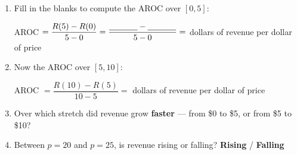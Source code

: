 \documentclass[10pt]{article}
\begin{document}
\boxguard
\begin{tcolorbox}[colback=white, colframe=black!40,
    title=\textbf{Tier R --- Remediate},
    fonttitle=\bfseries, arc=2mm, left=3mm, right=3mm, top=2mm, bottom=2mm]

\begin{enumerate}[itemsep=8pt]
  \item Fill in the blanks to compute the AROC over $[0, 5]$:

        \vspace{0.05in}
        AROC $= \dfrac{R(5) - R(0)}{5 - 0} = \dfrac{\text{\blank{1.2cm}} - \text{\blank{1.2cm}}}{5 - 0}
        = $ \blank{1.4cm} dollars of revenue per dollar of price

  \item Now the AROC over $[5, 10]$:

        \vspace{0.05in}
        AROC $= \dfrac{R(10) - R(5)}{10 - 5} = $ \blank{1.4cm} dollars of
        revenue per dollar of price

  \item Over which stretch did revenue grow \textbf{faster} --- from \$0 to
        \$5, or from \$5 to \$10? \quad \blank{2.4cm}

  \item Between $p = 20$ and $p = 25$, is revenue rising or falling? \quad
        \textbf{Rising} / \textbf{Falling}
\end{enumerate}
\end{tcolorbox}

\vspace{0.1in}
\end{document}
